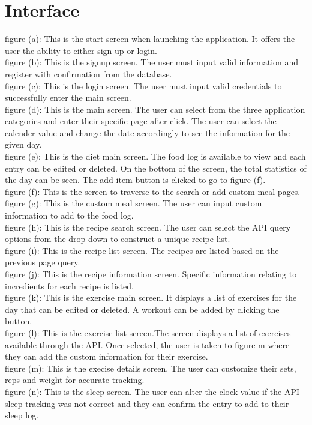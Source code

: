 \documentclass[12pt, titlepage]{article}
\begin{document}
	
	\newpage{}
	
	\appendix
	
	\section{Interface}
	
	figure (a): This is the start screen when launching the application. It offers the user the ability to either sign up or login.
	\\figure (b): This is the signup screen. The user must input valid information and register with confirmation from the database.
	\\figure (c): This is the login screen. The user must input valid credentials to successfully enter the main screen.
	\\figure (d): This is the main screen. The user can select from the three application categories and enter their specific page after click. The user can select the calender value and change the date accordingly to see the information for the given day.
	\\figure (e): This is the diet main screen. The food log is available to view and each entry can be edited or deleted. On the bottom of the screen, the total statistics of the day can be seen. The add item button is clicked to go to figure (f).
	\\figure (f): This is the screen to traverse to the search or add custom meal pages.
	\\figure (g): This is the custom meal screen. The user can input custom information to add to the food log.
	\\figure (h): This is the recipe search screen. The user can select the API query options from the drop down to construct a unique recipe list.
	\\figure (i): This is the recipe list screen. The recipes are listed based on the previous page query. 
	\\figure (j): This is the recipe information screen. Specific information relating to incredients for each recipe is listed.
	\\figure (k): This is the exercise main screen. It displays a list of exercises for the day that can be edited or deleted. A workout can be added by clicking the button.
	\\figure (l): This is the exercise list screen.The screen displays a list of exercises available through the API. Once selected, the user is taken to figure m where they can add the custom information for their exercise. 
	\\figure (m): This is the execise details screen. The user can customize their sets, reps and weight for accurate tracking.
	\\figure (n): This is the sleep screen. The user can alter the clock value if the API sleep tracking was not correct and they can confirm the entry to add to their sleep log. 
	
\end{document}
